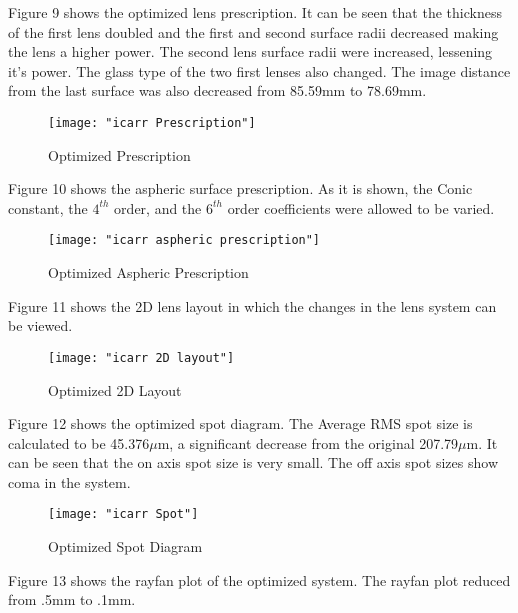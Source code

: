 \documentclass{article}
\begin{document}
Figure 9 shows the optimized lens prescription. It can be seen that the thickness of the first lens doubled and the first and second surface radii decreased making the lens a higher power. The second lens surface radii were increased, lessening it's power. The glass type of the two first lenses also changed. The image distance from the last surface was also decreased from 85.59mm to 78.69mm.\\

\begin{figure}[H]
	\texttt{[image: "icarr Prescription"]}
	\centering
	\caption{Optimized Prescription}
	\centering
\end{figure}


Figure 10 shows the aspheric surface prescription. As it is shown, the Conic constant, the $4^{th}$ order, and the $6^{th}$ order coefficients were allowed to be varied.\\

\begin{figure}[H]
	\texttt{[image: "icarr aspheric prescription"]}
	\centering
	\caption{Optimized Aspheric Prescription}
	\centering
\end{figure}

\newpage

Figure 11 shows the 2D lens layout in which the changes in the lens system can be viewed.\\

\begin{figure}[H]
	\texttt{[image: "icarr 2D layout"]}
	\centering
	\caption{Optimized 2D Layout}
	\centering
\end{figure}

\newpage

Figure 12 shows the optimized spot diagram. The Average RMS spot size is calculated to be 45.376$\mu$m, a significant decrease from the original 207.79$\mu$m. It can be seen that the on axis spot size is very small. The off axis spot sizes show coma in the system.\par

\begin{figure}[H]
	\texttt{[image: "icarr Spot"]}
	\centering
	\caption{Optimized Spot Diagram}
	\centering
\end{figure}

\newpage

Figure 13 shows the rayfan plot of the optimized system. The rayfan plot reduced from .5mm to .1mm.\\
\end{document}
